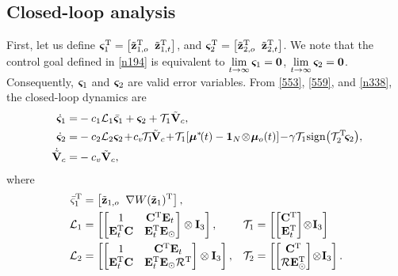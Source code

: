 \subsection{Closed-loop analysis}

First, let us define $\bm{\varsigma}_1^{\mathrm{T}} = \left[\tilde{\mathbf{z}}_{1, o}^{\mathrm{T}}\;\;\tilde{\mathbf{z}}_{1, t}^{\mathrm{T}}\right]$, and $\bm{\varsigma}_2^{\mathrm{T}}=\left[\tilde{\mathbf{z}}_{2, o}^{\mathrm{T}}\;\;\tilde{\mathbf{z}}_{2, t}^{\mathrm{T}}\right]$.
We note that the control goal defined in \eqref{n194} is equivalent to $\lim\limits_{t \rightarrow \infty} \bm{\varsigma}_1 = \mathbf{0}$, $\lim\limits_{t \rightarrow \infty} \bm{\varsigma}_2 = \mathbf{0}$.
Consequently, $\bm{\varsigma}_1$ and $\bm{\varsigma}_2$ are valid error variables.
From \eqref{553}, \eqref{559}, and \eqref{n338}, the closed-loop dynamics are
\begin{subequations}\label{n560}\begin{align}
	\dot{\bs{\varsigma}}_1 =& -c_1\mathcal{L}_1\bar{\bs{\varsigma}}_1+\bs{\varsigma}_2+\mathcal{T}_1\tilde{\mat{V}}_c, \label{n560-a}\\
	\dot{\bs{\varsigma}}_2 =& -c_2\mathcal{L}_2\bs{\varsigma}_{2\!}+\!c_{v\!}\mathcal{T}_1\!\tilde{\mat{V}}_c\!+\!\mathcal{T}_1\!\left[\bs{\mu}^*\!(t)-\mathbf{1}_{N}\!\otimes\!\bs{\mu}_o(t)\right]\!-\!\gamma\mathcal{T}_1{\rm sign}\!\left(\mathcal{T}_2\T\!\bs{\varsigma}_2\right)\!\mathrlap{,}\label{n560-b}\\
	\dot{\tilde{\mat{V}}}_c =& -c_v\tilde{\mat{V}}_c, \label{n560-c}
\end{align}\end{subequations}	
where
\begin{subequations} \label{570} \begin{align}
	\bar\varsigma_1^{\mathrm{T}} &= \left[\tilde{\mathbf{z}}_{1, o}\;\;\nabla W(\tilde{\mathbf{z}}_{1})^{\mathrm{T}} \right], & & \label{570-a} \\
	\mathcal{L}_1&=\left[\left[\begin{matrix}
		1&\mathbf{C}^{\mathrm{T}} \mathbf{E}_t\\\mathbf{E}_t^{\mathrm{T}} \mathbf{C}&\mathbf{E}_t^{\mathrm{T}} \mathbf{E}_\odot
		\end{matrix}\right]\otimes \mathbf{I}_3\right],& 
		\mathcal{T}_1 &=\left[\left[\begin{matrix}
		\mathbf{C}^{\mathrm{T}}\\\mathbf{E}_t^{\mathrm{T}}
		\end{matrix}\right]\!\otimes\! \mathbf{I}_3\right] \label{570-b} \\
		\mathcal{L}_2&=\left[\left[\begin{matrix}
		1&\mathbf{C}^{\mathrm{T}} \mathbf{E}_t\\\mathbf{E}_t^{\mathrm{T}} \mathbf{C}&\mathbf{E}_t^{\mathrm{T}} \mathbf{E}_\odot \mathcal{R}^{\mathrm{T}}
		\end{matrix}\right]\otimes \mathbf{I}_3\right],&
		\mathcal{T}_2&=\left[\left[\begin{matrix}
		\mathbf{C}^{\mathrm{T}}\\\mathcal{R} \mathbf{E}_\odot^{\mathrm{T}}
		\end{matrix}\right]\!\otimes\! \mathbf{I}_3\right]. \label{570-c}
\end{align} \end{subequations}

